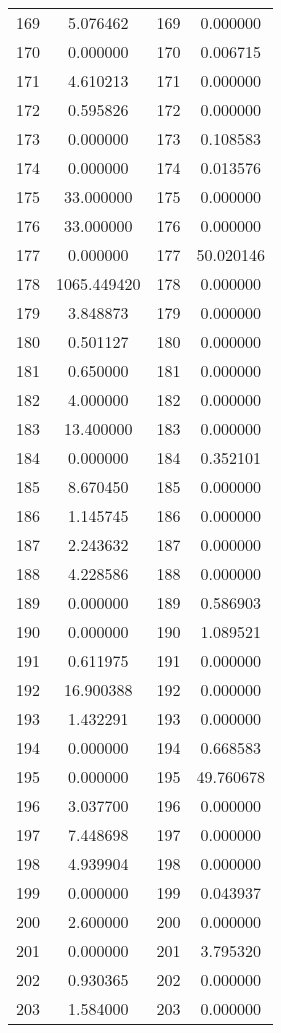 \documentclass[12pt]{article}
\begin{document}
\begin{longtable}{@{}cccc@{}}
169 & 5.076462 & 169 & 0.000000 \\
170 & 0.000000 & 170 & 0.006715 \\
171 & 4.610213 & 171 & 0.000000 \\
172 & 0.595826 & 172 & 0.000000 \\
173 & 0.000000 & 173 & 0.108583 \\
174 & 0.000000 & 174 & 0.013576 \\
175 & 33.000000 & 175 & 0.000000 \\
176 & 33.000000 & 176 & 0.000000 \\
177 & 0.000000 & 177 & 50.020146 \\
178 & 1065.449420 & 178 & 0.000000 \\
179 & 3.848873 & 179 & 0.000000 \\
180 & 0.501127 & 180 & 0.000000 \\
181 & 0.650000 & 181 & 0.000000 \\
182 & 4.000000 & 182 & 0.000000 \\
183 & 13.400000 & 183 & 0.000000 \\
184 & 0.000000 & 184 & 0.352101 \\
185 & 8.670450 & 185 & 0.000000 \\
186 & 1.145745 & 186 & 0.000000 \\
187 & 2.243632 & 187 & 0.000000 \\
188 & 4.228586 & 188 & 0.000000 \\
189 & 0.000000 & 189 & 0.586903 \\
190 & 0.000000 & 190 & 1.089521 \\
191 & 0.611975 & 191 & 0.000000 \\
192 & 16.900388 & 192 & 0.000000 \\
193 & 1.432291 & 193 & 0.000000 \\
194 & 0.000000 & 194 & 0.668583 \\
195 & 0.000000 & 195 & 49.760678 \\
196 & 3.037700 & 196 & 0.000000 \\
197 & 7.448698 & 197 & 0.000000 \\
198 & 4.939904 & 198 & 0.000000 \\
199 & 0.000000 & 199 & 0.043937 \\
200 & 2.600000 & 200 & 0.000000 \\
201 & 0.000000 & 201 & 3.795320 \\
202 & 0.930365 & 202 & 0.000000 \\
203 & 1.584000 & 203 & 0.000000 \\

\end{longtable}
\end{document}
